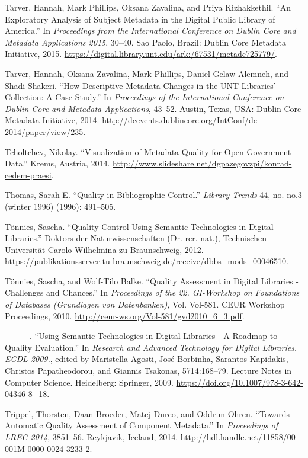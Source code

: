 Tarver, Hannah, Mark Phillips, Oksana Zavalina, and Priya Kizhakkethil. “An Exploratory Analysis of Subject Metadata in the Digital Public Library of America.” In \emph{Proceedings from the International Conference on Dublin Core and Metadata Applications 2015}, 30–40. Sao Paolo, Brazil: Dublin Core Metadata Initiative, 2015. \url{https://digital.library.unt.edu/ark:/67531/metadc725779/}.

Tarver, Hannah, Oksana Zavalina, Mark Phillips, Daniel Gelaw Alemneh, and Shadi Shakeri. “How Descriptive Metadata Changes in the UNT Libraries’ Collection: A Case Study.” In \emph{Proceedings of the International Conference on Dublin Core and Metadata Applications}, 43–52. Austin, Texas, USA: Dublin Core Metadata Initiative, 2014. \url{http://dcevents.dublincore.org/IntConf/dc-2014/paper/view/235}.

Tcholtchev, Nikolay. “Visualization of Metadata Quality for Open Government Data.” Krems, Austria, 2014. \url{http://www.slideshare.net/dgpazegovzpi/konrad-cedem-praesi}.

Thomas, Sarah E. “Quality in Bibliographic Control.” \emph{Library Trends} 44, no. no.3 (winter 1996) (1996): 491–505.

Tönnies, Sascha. “Quality Control Using Semantic Technologies in Digital Libraries.” Doktors der Naturwissenschaften (Dr. rer. nat.), Technischen Universität Carolo-Wilhelmina zu Braunschweig, 2012. \url{https://publikationsserver.tu-braunschweig.de/receive/dbbs_mods_00046510}.

Tönnies, Sascha, and Wolf-Tilo Balke. “Quality Assessment in Digital Libraries - Challenges and Chances.” In \emph{Proceedings of the 22. GI-Workshop on Foundations of Databases (Grundlagen von Datenbanken)}, Vol. Vol-581. CEUR Workshop Proceedings, 2010. \url{http://ceur-ws.org/Vol-581/gvd2010_6_3.pdf}.

———. “Using Semantic Technologies in Digital Libraries - A Roadmap to Quality Evaluation.” In \emph{Research and Advanced Technology for Digital Libraries. ECDL 2009.}, edited by Maristella Agosti, José Borbinha, Sarantos Kapidakis, Christos Papatheodorou, and Giannis Tsakonas, 5714:168–79. Lecture Notes in Computer Science. Heidelberg: Springer, 2009. \url{https://doi.org/10.1007/978-3-642-04346-8_18}.

Trippel, Thorsten, Daan Broeder, Matej Durco, and Oddrun Ohren. “Towards Automatic Quality Assessment of Component Metadata.” In \emph{Proceedings of LREC 2014}, 3851–56. Reykjavik, Iceland, 2014. \url{http://hdl.handle.net/11858/00-001M-0000-0024-3233-2}.

